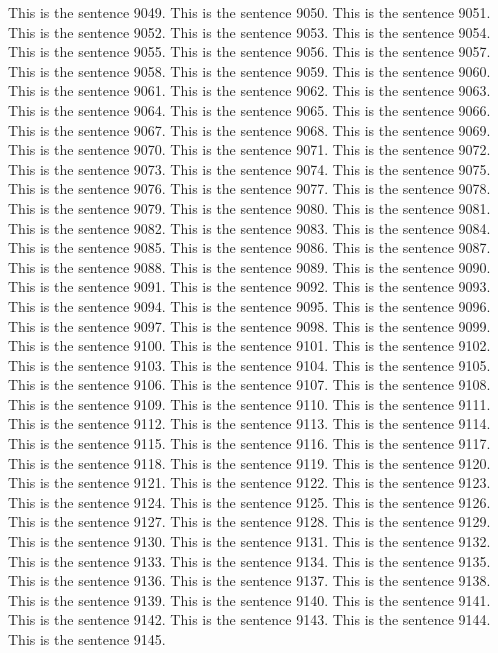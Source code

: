 \documentclass{article}
\begin{document}
This is the sentence 9049.
This is the sentence 9050.
This is the sentence 9051.
This is the sentence 9052.
This is the sentence 9053.
This is the sentence 9054.
This is the sentence 9055.
This is the sentence 9056.
This is the sentence 9057.
This is the sentence 9058.
This is the sentence 9059.
This is the sentence 9060.
This is the sentence 9061.
This is the sentence 9062.
This is the sentence 9063.
This is the sentence 9064.
This is the sentence 9065.
This is the sentence 9066.
This is the sentence 9067.
This is the sentence 9068.
This is the sentence 9069.
This is the sentence 9070.
This is the sentence 9071.
This is the sentence 9072.
This is the sentence 9073.
This is the sentence 9074.
This is the sentence 9075.
This is the sentence 9076.
This is the sentence 9077.
This is the sentence 9078.
This is the sentence 9079.
This is the sentence 9080.
This is the sentence 9081.
This is the sentence 9082.
This is the sentence 9083.
This is the sentence 9084.
This is the sentence 9085.
This is the sentence 9086.
This is the sentence 9087.
This is the sentence 9088.
This is the sentence 9089.
This is the sentence 9090.
This is the sentence 9091.
This is the sentence 9092.
This is the sentence 9093.
This is the sentence 9094.
This is the sentence 9095.
This is the sentence 9096.
This is the sentence 9097.
This is the sentence 9098.
This is the sentence 9099.
This is the sentence 9100.
This is the sentence 9101.
This is the sentence 9102.
This is the sentence 9103.
This is the sentence 9104.
This is the sentence 9105.
This is the sentence 9106.
This is the sentence 9107.
This is the sentence 9108.
This is the sentence 9109.
This is the sentence 9110.
This is the sentence 9111.
This is the sentence 9112.
This is the sentence 9113.
This is the sentence 9114.
This is the sentence 9115.
This is the sentence 9116.
This is the sentence 9117.
This is the sentence 9118.
This is the sentence 9119.
This is the sentence 9120.
This is the sentence 9121.
This is the sentence 9122.
This is the sentence 9123.
This is the sentence 9124.
This is the sentence 9125.
This is the sentence 9126.
This is the sentence 9127.
This is the sentence 9128.
This is the sentence 9129.
This is the sentence 9130.
This is the sentence 9131.
This is the sentence 9132.
This is the sentence 9133.
This is the sentence 9134.
This is the sentence 9135.
This is the sentence 9136.
This is the sentence 9137.
This is the sentence 9138.
This is the sentence 9139.
This is the sentence 9140.
This is the sentence 9141.
This is the sentence 9142.
This is the sentence 9143.
This is the sentence 9144.
This is the sentence 9145.
\end{document}
